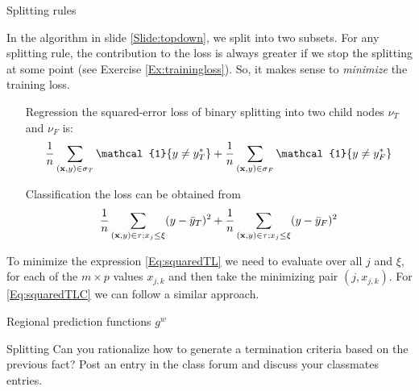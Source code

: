 \documentclass{beamer}
\begin{document}
\begin{frame}{Splitting rules}
    
    In the algorithm in slide \ref{Slide:topdown}, we split into two subsets. For any splitting rule, the contribution to the loss is always greater if we stop the splitting at some point (see Exercise \ref{Ex:trainingloss}). So, it makes sense to {\em minimize} the training loss. 
    \begin{enumerate}
        \item[Regression] the squared-error loss of binary splitting into two child nodes $\nu_T$ and $\nu_F$  is:
        \begin{equation}
            \frac{1}{n}\sum_{(\uvec{x},y)\in\sigma_T}\mathcal{1}\{y\neq y_T^*\}+\frac{1}{n}\sum_{(\uvec{x},y)\in\sigma_F}\mathcal{1}\{y\neq y_F^*\}
            \label{Eq:squaredTLR}
        \end{equation}
        \item[Classification] the loss can be obtained from
        \begin{equation}
            \frac{1}{n}\sum_{(\textbf{x},y)\in\tau;x_j\leq \xi}(y-\bar{y}_T)^2+\frac{1}{n}\sum_{(\textbf{x},y)\in\tau;x_j\leq \xi}(y-\bar{y}_F)^2
            \label{Eq:squaredTLC}
        \end{equation}
    \end{enumerate}

    To minimize the expression \ref{Eq:squaredTL} we need to evaluate over all $j$ and $\xi$, for each of the $m\times p$ values $x_{j,k}$ and then take the minimizing pair $(j,x_{j,k})$. For \ref{Eq:squaredTLC} we can follow a similar approach.
\end{frame}

\begin{frame}{Regional prediction functions $g^{w}$}
    
    \begin{Exercise}{Splitting}
        Can you rationalize how to generate a termination criteria based on the previous fact? Post an entry in the class forum and discuss  your classmates entries.
    \end{Exercise}
\end{frame}
\end{document}
